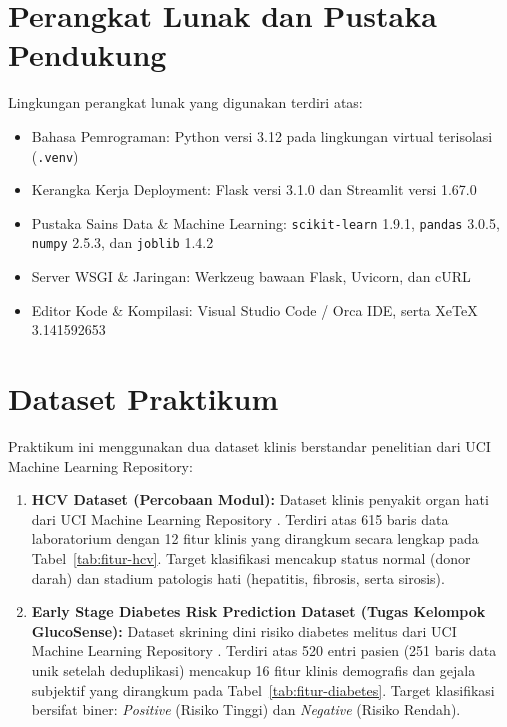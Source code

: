 \documentclass[a4paper,oneside,12pt]{report}
\begin{document}
\section{Perangkat Lunak dan Pustaka Pendukung}
Lingkungan perangkat lunak yang digunakan terdiri atas:
\begin{itemize}[noitemsep, topsep=2pt, parsep=1pt]
	\item Bahasa Pemrograman: Python versi 3.12 pada lingkungan virtual terisolasi (\texttt{.venv})
	\item Kerangka Kerja Deployment: Flask versi 3.1.0 dan Streamlit versi 1.67.0
	\item Pustaka Sains Data \& Machine Learning: \texttt{scikit-learn} 1.9.1, \texttt{pandas} 3.0.5, \texttt{numpy} 2.5.3, dan \texttt{joblib} 1.4.2
	\item Server WSGI \& Jaringan: Werkzeug bawaan Flask, Uvicorn, dan cURL
	\item Editor Kode \& Kompilasi: Visual Studio Code / Orca IDE, serta XeTeX 3.141592653
\end{itemize}

\section{Dataset Praktikum}
Praktikum ini menggunakan dua dataset klinis berstandar penelitian dari UCI Machine Learning Repository:
\begin{enumerate}[noitemsep, topsep=3pt, parsep=2pt]
	\item \textbf{HCV Dataset (Percobaan Modul):} Dataset klinis penyakit organ hati dari UCI Machine Learning Repository \cite{uci-hcv}. Terdiri atas 615 baris data laboratorium dengan 12 fitur klinis yang dirangkum secara lengkap pada Tabel~\ref{tab:fitur-hcv}. Target klasifikasi mencakup status normal (donor darah) dan stadium patologis hati (hepatitis, fibrosis, serta sirosis).
	\item \textbf{Early Stage Diabetes Risk Prediction Dataset (Tugas Kelompok GlucoSense):} Dataset skrining dini risiko diabetes melitus dari UCI Machine Learning Repository \cite{uci-diabetes,islam2020}. Terdiri atas 520 entri pasien (251 baris data unik setelah deduplikasi) mencakup 16 fitur klinis demografis dan gejala subjektif yang dirangkum pada Tabel~\ref{tab:fitur-diabetes}. Target klasifikasi bersifat biner: \textit{Positive} (Risiko Tinggi) dan \textit{Negative} (Risiko Rendah).
\end{enumerate}
\end{document}
